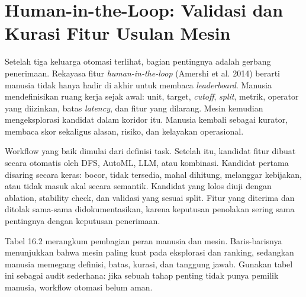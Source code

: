 \section{Human-in-the-Loop: Validasi dan Kurasi Fitur Usulan Mesin}\label{human-in-the-loop-validasi-dan-kurasi-fitur-usulan-mesin}

Setelah tiga keluarga otomasi terlihat, bagian pentingnya adalah gerbang penerimaan. Rekayasa fitur \emph{human-in-the-loop} (Amershi et al. 2014) berarti manusia tidak hanya hadir di akhir untuk membaca \emph{leaderboard}. Manusia mendefinisikan ruang kerja sejak awal: unit, target, \emph{cutoff}, \emph{split}, metrik, operator yang diizinkan, batas \emph{latency}, dan fitur yang dilarang. Mesin kemudian mengeksplorasi kandidat dalam koridor itu. Manusia kembali sebagai kurator, membaca skor sekaligus alasan, risiko, dan kelayakan operasional.

Workflow yang baik dimulai dari definisi task. Setelah itu, kandidat fitur dibuat secara otomatis oleh DFS, AutoML, LLM, atau kombinasi. Kandidat pertama disaring secara keras: bocor, tidak tersedia, mahal dihitung, melanggar kebijakan, atau tidak masuk akal secara semantik. Kandidat yang lolos diuji dengan ablation, stability check, dan validasi yang sesuai split. Fitur yang diterima dan ditolak sama-sama didokumentasikan, karena keputusan penolakan sering sama pentingnya dengan keputusan penerimaan.

Tabel 16.2 merangkum pembagian peran manusia dan mesin. Baris-barisnya menunjukkan bahwa mesin paling kuat pada eksplorasi dan ranking, sedangkan manusia memegang definisi, batas, kurasi, dan tanggung jawab. Gunakan tabel ini sebagai audit sederhana: jika sebuah tahap penting tidak punya pemilik manusia, workflow otomasi belum aman.


